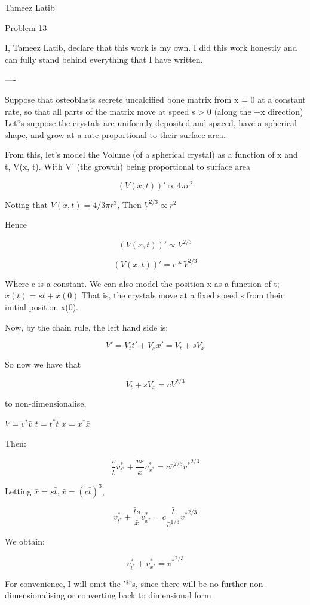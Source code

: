 \documentclass{article}
\begin{document}
Tameez Latib

Problem 13

I, Tameez Latib, declare that this work is my own. I did this work honestly and can fully stand behind everything that I have written.

----

Suppose that osteoblasts secrete uncalcified bone matrix from  x = 0 at a constant
rate, so that all parts of the matrix move at speed s > 0 (along the +x direction)
Let?s suppose the crystals are uniformly deposited and spaced, have a spherical shape, and
grow at a rate proportional to their surface area.

From this, let's model the Volume (of a spherical crystal) as a function of x and t, V(x, t). With V' (the growth) being proportional to surface area 

$$(V(x, t))' \propto 4\pi r^2$$ 

Noting that $V(x,t) = 4/3 \pi r^3$, Then $V^{2/3} \propto r^2$

Hence

$$(V(x, t))' \propto V^{2/3}$$ 

$$(V(x, t))' = c*V^{2/3}$$ 

Where c is a constant. We can also model the position x as a function of t; $x(t) = st + x(0)$
That is, the crystals move at a fixed speed s from their initial position x(0). 

Now, by the chain rule, the left hand side is:

$$V' = V_t t' + V_x x' = V_t + sV_x$$

So now we have that 

$$V_t + sV_x = cV^{2/3}$$

to non-dimensionalise, 

$V = v^*\bar{v}$
$t = t^*\bar{t}$
$x = x^*\bar{x}$

Then:

$$\frac{\bar{v}}{\bar{t}}v^*_{t^*} + \frac{\bar{v}s}{\bar{x}}v^*_{x^*} = c\bar{v}^{2/3}{v^*}^{2/3}$$

Letting $\bar{x} = s\bar{t}$, $\bar{v} = (c\bar{t})^3$,

$$v^*_{t^*} + \frac{\bar{t}s}{\bar{x}}v^*_{x^*} = c\frac{\bar{t}}{\bar{v}^{1/3}}{v^*}^{2/3}$$

We obtain:

$$v^*_{t^*} + v^*_{x^*} = {v^*}^{2/3}$$

For convenience, I will omit the '*'s, since there will be no further non-dimensionalising or converting back to dimensional form
\end{document}
